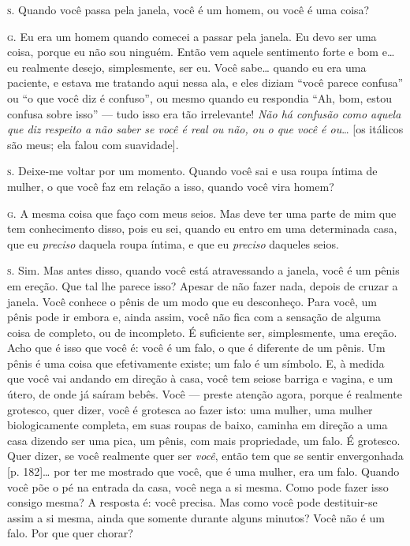\noindent\hskip0mm\textsc{s.} Quando você passa pela janela, você é um homem, ou você é uma coisa?

\noindent\hskip0mm\textsc{g.} Eu era um homem quando comecei a passar pela janela. Eu devo ser uma
coisa, porque eu não sou ninguém. Então vem aquele sentimento forte e
bom e\ldots{} eu realmente desejo, simplesmente, ser eu. Você sabe\ldots{} quando
eu era uma paciente, e estava me tratando aqui nessa ala, e eles diziam
``você parece confusa'' ou ``o
que você diz é confuso'', ou mesmo quando eu respondia
``Ah, bom, estou confusa sobre isso'' ---
tudo isso era tão irrelevante! \textit{Não há confusão como aquela que
diz respeito a não saber se você é real ou não, ou o que você é ou}\ldots{}
[os itálicos são meus; ela falou com suavidade].

\noindent\hskip0mm\textsc{s.} Deixe-me voltar por um momento. Quando você sai e usa roupa íntima de
mulher, o que você faz em relação a isso, quando você vira homem?

\noindent\hskip0mm\textsc{g.} A mesma coisa que faço com meus seios. Mas deve ter uma parte de mim
que tem conhecimento disso, pois eu sei, quando eu entro em uma
determinada casa, que eu \textit{preciso} daquela roupa íntima, e que
eu \textit{preciso} daqueles seios.

\noindent\hskip0mm\textsc{s.} Sim. Mas antes disso, quando você está atravessando a janela, você é
um pênis em ereção. Que tal lhe parece isso? Apesar de não fazer nada,
depois de cruzar a janela. Você conhece o pênis de um modo que eu
desconheço. Para você, um pênis pode ir embora e, ainda assim, você não
fica com a sensação de alguma coisa de completo, ou de incompleto. É
suficiente ser, simplesmente, uma ereção. Acho que é isso que você é:
você é um falo, o que é diferente de um pênis. Um pênis é uma coisa que
efetivamente existe; um falo é um símbolo.\idxpervsimbo{} E, à medida que você vai andando
em direção à casa, você tem seios\idxseios[|)] e barriga e vagina, e um útero, de
onde já saíram bebês. Você --- preste atenção agora, porque é
realmente grotesco, quer dizer, você é grotesca ao fazer isto: uma
mulher, uma mulher biologicamente completa, em suas roupas de baixo,
caminha em direção a uma casa dizendo ser uma pica, um pênis,\idxpenisimag{} com mais
propriedade, um falo. É grotesco. Quer dizer, se você realmente quer
ser \textit{você}, então tem que se sentir envergonhada [p. 182]\ldots{} por
ter me mostrado que você, que é uma mulher, era um falo. Quando você
põe o pé na entrada da casa, você nega a si mesma. Como pode fazer isso
consigo mesma? A resposta é: você precisa. Mas como você pode
destituir-se assim a si mesma, ainda que somente durante alguns
minutos? Você não é um falo.\idxidenhis{} Por que quer chorar?

